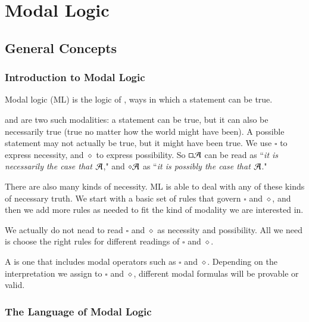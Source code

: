 \documentclass[12pt, a4paper, twoside, openright, titlepage]{book}
\begin{document}
\part{Modal Logic}

\chapter{\textsection\textsection General Concepts}

\section{\textsection Introduction to Modal Logic}

Modal logic (ML) is the logic of , ways in which a statement can be true.

\begin{eg}{}{}
     and  are two such modalities: a statement can be true, but it can also be necessarily true (true no matter how the world might have been). A possible statement may not actually be true, but it might have been true. We use $\square$ to express necessity, and $\diamond$ to express possibility. So $\square\mathcal{A}$ can be read as ``\emph{it is necessarily the case that $\mathcal{A}$}," and $\diamond\mathcal{A}$ as ``\emph{it is possibly the case that $\mathcal{A}$}."
\end{eg}

There are also many kinds of necessity. ML is able to deal with any of these kinds of necessary truth. We start with a basic set of rules that govern $\square$ and $\diamond$, and then we add more rules as needed to fit the kind of modality we are interested in. 


We actually do not nead to read $\square$ and $\diamond$ as necessity and possibility. All we need is choose the right rules for different readings of $\square$ and $\diamond$.

\begin{defn}{}{}
    A  is one that includes modal operators such as $\square$ and $\diamond$. Depending on the interpretation we assign to $\square$ and $\diamond$, different modal formulas will be provable or valid.
\end{defn}


\section{\textsection The Language of Modal Logic}
\end{document}
